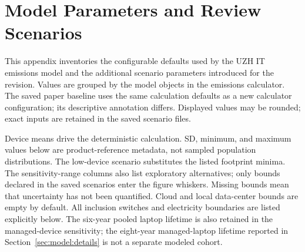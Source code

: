 \section{Model Parameters and Review Scenarios}
\label{app:parameters}

This appendix inventories the configurable defaults used by the UZH IT emissions model and the additional scenario parameters introduced for the revision. Values are grouped by the model objects in the emissions calculator. The saved paper baseline uses the same calculation defaults as a new calculator configuration; its descriptive annotation differs. Displayed values may be rounded; exact inputs are retained in the saved scenario files.

Device means drive the deterministic calculation. SD, minimum, and maximum
values below are product-reference metadata, not sampled population
distributions. The low-device scenario substitutes the listed footprint minima.
The sensitivity-range columns also list exploratory alternatives; only bounds
declared in the saved scenarios enter the figure whiskers. Missing bounds mean
that uncertainty has not been quantified. Cloud and local data-center bounds are empty by default. All inclusion switches and electricity
boundaries are listed explicitly below. The six-year pooled laptop lifetime is
also retained in the managed-device sensitivity; the eight-year managed-laptop
lifetime reported in Section~\ref{sec:model:details} is not a separate modeled
cohort.

